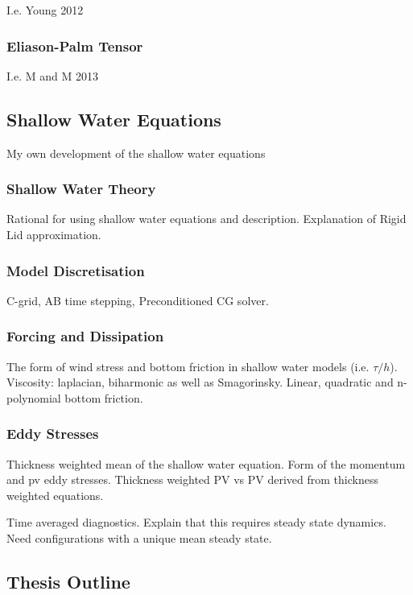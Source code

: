 \documentclass[10pt,a4paper]{article}
\begin{document}
I.e. Young 2012

\subsubsection{Eliason-Palm Tensor}

I.e. M and M 2013

\subsection{Shallow Water Equations}

My own development of the shallow water equations

\subsubsection{Shallow Water Theory}

Rational for using shallow water equations and
description. Explanation of Rigid Lid approximation.

\subsubsection{Model Discretisation}

C-grid, AB time stepping, Preconditioned CG solver. 

\subsubsection{Forcing and Dissipation}

The form of wind stress and bottom friction in
shallow water models (i.e. $\tau/h$). Viscosity:
laplacian, biharmonic as well as Smagorinsky.
Linear, quadratic and n-polynomial bottom friction.

\subsubsection{Eddy Stresses}

Thickness weighted mean of the shallow water
equation. Form of the momentum and pv eddy stresses.
Thickness weighted PV vs PV derived from thickness weighted equations.

Time averaged diagnostics. Explain that this requires steady state dynamics. Need configurations
with a unique mean steady state.

\subsection{Thesis Outline}
\end{document}
